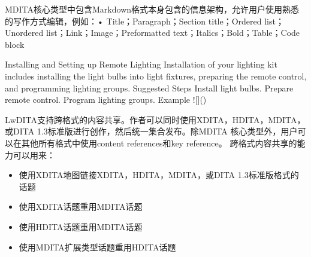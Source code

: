 \documentclass[letterpaper,10pt,english]{sphinxmanual}
\begin{document}
MDITA核心类型中包含Markdown格式本身包含的信息架构，允许用户使用熟悉的写作方式编辑，例如：• Title；Paragraph；Section title；Ordered list；Unordered list；Link；Image；Preformatted text；Italics；Bold；Table；Code block

\begin{sphinxVerbatim}[commandchars=\\\{\}]
 Installing and Setting up Remote Lighting
Installation of your lighting kit includes installing the light bulbs into light
fixtures, preparing the remote control, and programming lighting groups.
 Suggested Steps
 Install light bulbs.
 Prepare remote control.
 Program lighting groups.
 Example
![]()
\end{sphinxVerbatim}

LwDITA支持跨格式的内容共享。作者可以同时使用XDITA，HDITA，MDITA，或DITA 1.3标准版进行创作，然后统一集合发布。除MDITA 核心类型外，用户可以在其他所有格式中使用content references和key reference。
跨格式内容共享的能力可以用来：
\begin{itemize}
\item {} 
使用XDITA地图链接XDITA，HDITA，MDITA，或DITA 1.3标准版格式的话题

\item {} 
使用XDITA话题重用MDITA话题

\item {} 
使用HDITA话题重用MDITA话题

\item {} 
使用MDITA扩展类型话题重用HDITA话题

\end{itemize}
\end{document}
